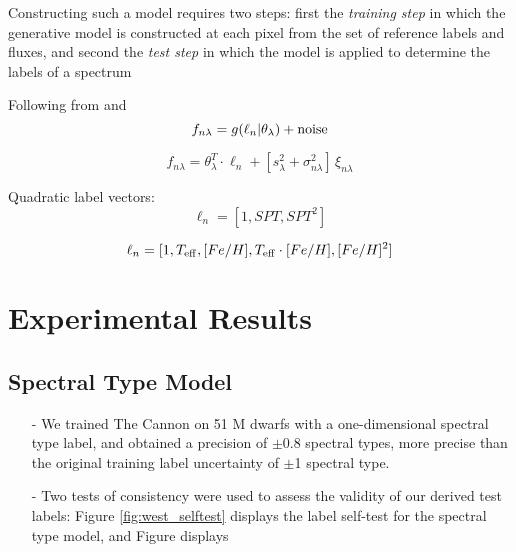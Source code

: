 \documentclass[modern]{aastex62}
\begin{document}
Constructing such a model requires two steps: first the \emph{training step} in which the generative model is constructed at each pixel from the set of reference labels and fluxes, and second the \emph{test step} in which the model is applied to determine the labels of a spectrum 


Following from \citealt{Ness:2015} and \citealt{Ho:2017a} 
\begin{equation}
	f_{n\lambda} = g(\ell_n | \theta_{\lambda}) + {\rm noise}
\end{equation}

\begin{equation}
	f_{n\lambda} = \theta_{\lambda}^{T} \cdot \ell_{n} + [s_{\lambda}^{2} + \sigma_{n\lambda}^{2}] \,\xi_{n\lambda}
\end{equation}

Quadratic label vectors:
\begin{equation}
	\ell_{n} = [1, SPT, SPT^{2}]
\end{equation}

\begin{equation}
	\ell_{n} = [1, T_{\rm eff}, [Fe/H], T_{\rm eff} \cdot [Fe/H], [Fe/H]^{2}]
\end{equation}


\section{Experimental Results} \label{sec:results}

\subsection{Spectral Type Model}

\begin{enumerate}
\item[-] We trained The Cannon on 51 M dwarfs with a one-dimensional spectral type label, and obtained a precision of $\pm$0.8 spectral types, more precise than the original training label uncertainty of $\pm$1 spectral type.
\item[-] Two tests of consistency were used to assess the validity of our derived test labels: Figure \ref{fig:west_selftest} displays the label self-test for the spectral type model, and Figure  displays 
\end{enumerate}
\end{document}
